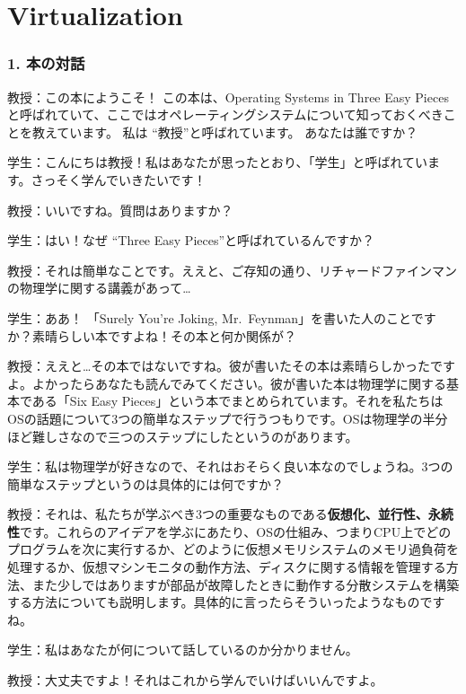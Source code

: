 \part{Virtualization}

\hypertarget{ux672cux306eux5bfeux8a71}{%
\section*{1. 本の対話}\label{ux672cux306eux5bfeux8a71}}

教授：この本にようこそ！ この本は、Operating Systems in Three Easy
Piecesと呼ばれていて、ここではオペレーティングシステムについて知っておくべきことを教えています。
私は ``教授''と呼ばれています。 あなたは誰ですか？

学生：こんにちは教授！私はあなたが思ったとおり、「学生」と呼ばれています。さっそく学んでいきたいです！

教授：いいですね。質問はありますか？

学生：はい！なぜ ``Three Easy Pieces''と呼ばれているんですか？

教授：それは簡単なことです。ええと、ご存知の通り、リチャードファインマンの物理学に関する講義があって\ldots{}

学生：ああ！ 「Surely You're Joking,
Mr.~Feynman」を書いた人のことですか？素晴らしい本ですよね！その本と何か関係が？

教授：ええと\ldots その本ではないですね。彼が書いたその本は素晴らしかったですよ。よかったらあなたも読んでみてください。彼が書いた本は物理学に関する基本である「Six
Easy
Pieces」という本でまとめられています。それを私たちはOSの話題について3つの簡単なステップで行うつもりです。OSは物理学の半分ほど難しさなので三つのステップにしたというのがあります。

学生：私は物理学が好きなので、それはおそらく良い本なのでしょうね。3つの簡単なステップというのは具体的には何ですか？

教授：それは、私たちが学ぶべき3つの重要なものである\textbf{仮想化、並行性、永続性}です。これらのアイデアを学ぶにあたり、OSの仕組み、つまりCPU上でどのプログラムを次に実行するか、どのように仮想メモリシステムのメモリ過負荷を処理するか、仮想マシンモニタの動作方法、ディスクに関する情報を管理する方法、また少しではありますが部品が故障したときに動作する分散システムを構築する方法についても説明します。具体的に言ったらそういったようなものですね。

学生：私はあなたが何について話しているのか分かりません。

教授：大丈夫ですよ！それはこれから学んでいけばいいんですよ。

